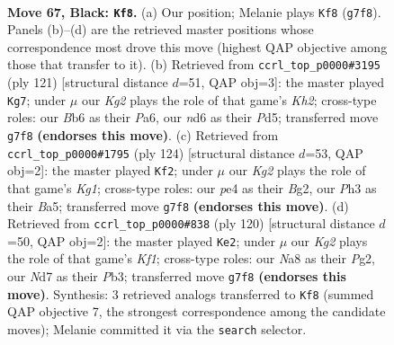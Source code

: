 \documentclass[11pt]{article}
\begin{document}
\clearpage

\begin{figure}[p]\centering
\begin{subfigure}{0.46\textwidth}\centering
\resizebox{\linewidth}{!}{%
\newchessgame
\chessboard[
  setfen={n7/3n2k1/1b1N4/p7/P2pP3/1P5p/2B1P3/3K4 b - - 1 67},
  showmover=false,
  pgfstyle=straightmove, color=movearrow, markmove={g7-f8}
]}
\caption{}
\end{subfigure}\hfill
\begin{subfigure}{0.46\textwidth}\centering
\resizebox{\linewidth}{!}{%
\newchessgame
\chessboard[
  setfen={8/7k/p1P3p1/3p1b1p/3P1P1P/6B1/6P1/6K1 b - - 0 61},
  showmover=false,
  pgfstyle=straightmove, color=movearrow, markmove={h7-g7}
]}
\caption{}
\end{subfigure}
\\[4pt]
\begin{subfigure}{0.46\textwidth}\centering
\resizebox{\linewidth}{!}{%
\newchessgame
\chessboard[
  setfen={6k1/6p1/5p1p/Bp6/2b1PP1P/n5P1/6B1/6K1 w - - 0 63},
  showmover=false,
  pgfstyle=straightmove, color=movearrow, markmove={g1-f2}
]}
\caption{}
\end{subfigure}\hfill
\begin{subfigure}{0.46\textwidth}\centering
\resizebox{\linewidth}{!}{%
\newchessgame
\chessboard[
  setfen={8/4k1n1/p2p4/B1pP3p/3bB3/1P5P/6P1/5K2 w - - 1 61},
  showmover=false,
  pgfstyle=straightmove, color=movearrow, markmove={f1-e2}
]}
\caption{}
\end{subfigure}
\caption{\textbf{Move 67, Black: \texttt{Kf8}.} (a) Our position; Melanie plays \texttt{Kf8} (\texttt{g7f8}). Panels (b)--(d) are the retrieved master positions whose correspondence most drove this move (highest QAP objective among those that transfer to it). (b) Retrieved from \texttt{ccrl\_top\_p0000\#3195} (ply 121) [structural distance $d$=51, QAP obj=3]: the master played \texttt{Kg7}; under $\mu$ our \emph{Kg2} plays the role of that game's \emph{Kh2}; cross-type roles: our \emph{B}b6 as their \emph{P}a6, our \emph{n}d6 as their \emph{P}d5; transferred move \texttt{g7f8} \textbf{(endorses this move)}. (c) Retrieved from \texttt{ccrl\_top\_p0000\#1795} (ply 124) [structural distance $d$=53, QAP obj=2]: the master played \texttt{Kf2}; under $\mu$ our \emph{Kg2} plays the role of that game's \emph{Kg1}; cross-type roles: our \emph{p}e4 as their \emph{B}g2, our \emph{P}h3 as their \emph{B}a5; transferred move \texttt{g7f8} \textbf{(endorses this move)}. (d) Retrieved from \texttt{ccrl\_top\_p0000\#838} (ply 120) [structural distance $d$=50, QAP obj=2]: the master played \texttt{Ke2}; under $\mu$ our \emph{Kg2} plays the role of that game's \emph{Kf1}; cross-type roles: our \emph{N}a8 as their \emph{P}g2, our \emph{N}d7 as their \emph{P}b3; transferred move \texttt{g7f8} \textbf{(endorses this move)}. Synthesis: 3 retrieved analogs transferred to \texttt{Kf8} (summed QAP objective 7, the strongest correspondence among the candidate moves); Melanie committed it via the \texttt{search} selector.}
\label{fig:thought-m133}
\end{figure}
\end{document}
